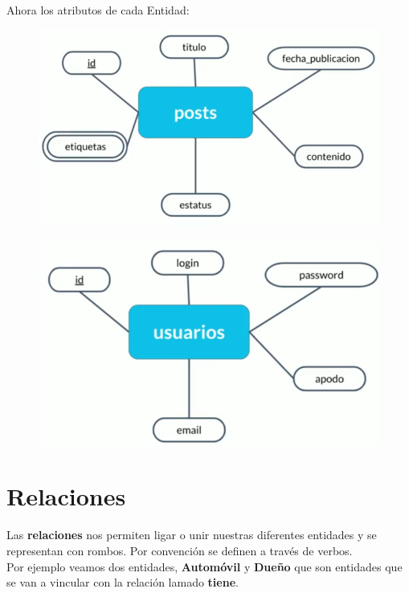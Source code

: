 \documentclass{article}
\begin{document}
Ahora los atributos de cada Entidad:

\begin{figure}[h!]
    \centering
      \includegraphics[scale=0.45]{./Pictures/009_post.png}
\end{figure}

\begin{figure}[h!]
    \centering
      \includegraphics[scale=0.45]{./Pictures/010_usuarios.png}
\end{figure}


\section{Relaciones}%
Las \textbf{relaciones} nos permiten ligar o unir nuestras diferentes entidades
y se representan con rombos. Por convención se definen a través de verbos.\\

Por ejemplo veamos dos entidades, \textbf{Automóvil} y \textbf{Dueño} que son
entidades que se van a vincular con la relación lamado \textbf{tiene}.\\
\end{document}
